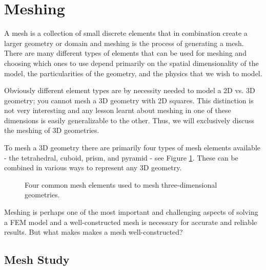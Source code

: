 \section{Meshing}\label{sec:meshing}

A mesh is a collection of small discrete elements that in combination create a larger geometry or domain and meshing is the process of generating a mesh.
There are many different types of elements that can be used for meshing and choosing which ones to use depend primarily on the spatial dimensionality of the model, the particularities of the geometry, and the physics that we wish to model.

Obviously different element types are by necessity needed to model a 2D vs. 3D geometry; you cannot mesh a 3D geometry with 2D squares.
This distinction is not very interesting and any lesson learnt about meshing in one of these dimensions is easily generalizable to the other.
Thus, we will exclusively discuss the meshing of 3D geometries.\par

To mesh a 3D geometry there are primarily four types of mesh elements available - the tetrahedral, cuboid, prism, and pyramid - see Figure \ref{fig:3d_elements}.
These can be combined in various ways to represent any 3D geometry.

\begin{figure}
  \caption{Four common mesh elements used to mesh three-dimensional geometries.}
  \label{fig:3d_elements}
\end{figure}

Meshing is perhaps one of the most important and challenging aspects of solving a FEM model and a well-constructed mesh is necessary for accurate and reliable results.
But what makes makes a mesh well-constructed?


\subsection{Mesh Study}
